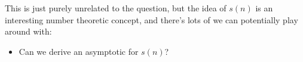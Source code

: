 \documentclass[a4paper, 12pt]{article}
\begin{document}
\begin{question}
    This is just purely unrelated to the question, but the idea of \( s(n) \) is an interesting number theoretic concept, and there's lots of we can potentially play around with:
    \begin{itemize}
        \item Can we derive an asymptotic for \( s(n) \)?
    \end{itemize}
\end{question}
\end{document}
